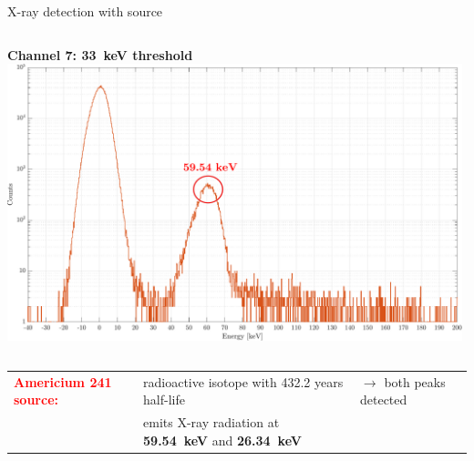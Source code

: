 \documentclass[aspectratio=169,xcolor=dvipsnames]{beamer} %
\newcommand\B{\rule[-1.2ex]{0pt}{0pt}} %
\newcommand{\greencheck}{{\color{ForestGreen}\checkmark}}
\begin{document}
\begin{frame}{X-ray detection with  source}
\begin{columns}
            \vskip0.18cm
            \textbf{Channel 7: \SI{33}{\kilo\electronvolt} threshold}
            \vskip0.1cm
            \includegraphics[width=0.99\textwidth]{images/muon_detection/americium/ch4_americio_log_ch7.pdf}  
    \end{columns}
    \fontsize{8.5pt}{1}\selectfont
    \vspace{0.2cm}
    \begin{tabular}{R{3cm} L{6.2cm} L{5cm}}
         \textbf{\textcolor{Red}{Americium 241 source:}} & radioactive isotope with 432.2 years half-life & $\rightarrow$ \hspace{0.2cm} both peaks detected \greencheck \B \\
         & emits X-ray radiation at \textbf{\SI{59.54}{\kilo\electronvolt}} and \textbf{\SI{26.34}{\kilo\electronvolt}}
    \end{tabular}
\end{frame}


\end{document}
